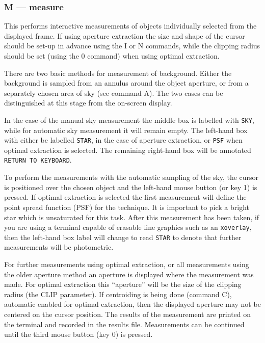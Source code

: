 \documentclass[twoside,11pt]{article}
\renewcommand{\_}{\texttt{\symbol{95}}}
\begin{document}
\subsubsection{M --- measure}

This performs interactive measurements of objects individually selected
from the displayed frame. If using aperture extraction the size and shape 
of the cursor should be set-up in advance using the I or N commands, while
the clipping radius should be set (using the 0 command) when using optimal
extraction.

There are two basic methods for measurement of background. Either the
background is sampled from an annulus around the object aperture, or
from a separately chosen area of sky (see command A). The two cases can be
distinguished at this stage from the on-screen display.

In the case of the manual sky measurement the middle box is
labelled with \texttt{SKY}, while for automatic sky measurement it
will remain empty. The left-hand box with either be labelled \texttt{STAR}, 
in the case of  aperture extraction, or \texttt{PSF} when optimal extraction is
selected. The remaining right-hand box will be annotated \texttt{RETURN~TO~KEYBOARD}.

To perform the measurements with the automatic sampling of the sky,
the cursor is positioned over the chosen object and the left-hand
mouse button (or key 1) is pressed. If optimal extraction is selected
the first measurement will define the point spread function (PSF) for
the technique. It is important to pick a bright star which is unsaturated
for this task. After this measurement has been taken, if you are using a terminal capable of erasable line graphics such as an \texttt{xoverlay}, 
then the left-hand box  label will change to read \texttt{STAR} to denote that
further measurements will be photometric.

For further measurements using optimal extraction, or all measurements 
using the older aperture method an aperture is displayed where the measurement was made. For optimal extraction this ``aperture'' will be the size of
the clipping radius (the CLIP parameter). If centroiding is being done 
(command C), automatic enabled for optimal extraction, then the displayed aperture may not be centered on the cursor position. The results of the measurement are printed on the terminal and recorded in the results file. Measurements can be continued until the third mouse button (key 0) is pressed.
\end{document}
